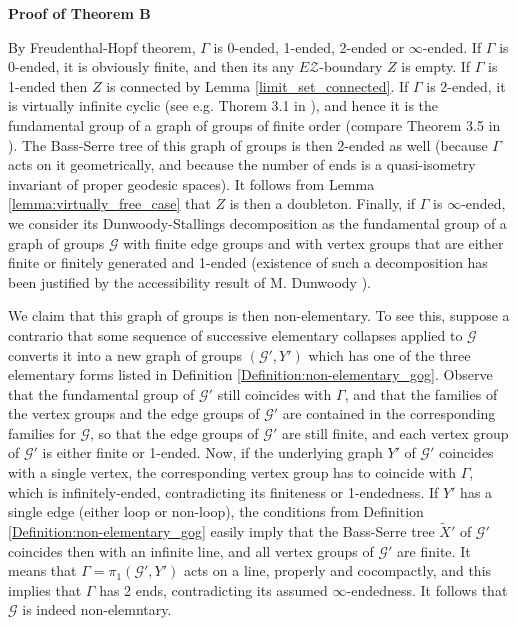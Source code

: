\documentclass[12pt, a4paper]{article}
\newcommand{\8}{\infty}
\theoremstyle{break}
\theoremstyle{defbreak}
\newcommand{\wtl}[1]{\widetilde{#1}}
\begin{document}
\noindent
{\bf Proof of Theorem B}

By Freudenthal-Hopf theorem, $\Gamma$ is 0-ended, 1-ended, 2-ended or
$\infty$-ended. If $\Gamma$ is 0-ended, it is obviously finite, and then its 
any $E\mathcal{Z}$-boundary $Z$ is empty.
If $\Gamma$ is 1-ended then $Z$ is connected by
Lemma \ref{limit_set_connected}. If $\Gamma$ is 2-ended, it is virtually infinite cyclic
(see e.g. Thorem 3.1 in \cite{Wall}), and hence it is the fundamental group
of a graph of groups of finite order (compare Theorem 3.5 in \cite{Wall}). 
The Bass-Serre tree of this 
graph of groups
is then 2-ended as well  (because $\Gamma$
acts on it geometrically, and because the number of ends is a quasi-isometry invariant of proper geodesic spaces). It follows from Lemma \ref{lemma:virtually_free_case} 
that $Z$ is then a doubleton.
Finally, if $\Gamma$ is $\infty$-ended, we consider its Dunwoody-Stallings
decomposition as the fundamental group of a graph of groups
$\mathcal{G}$
with finite edge groups and with vertex groups that are either finite
or finitely generated and 1-ended (existence of such a decomposition has been justified by the accessibility result of M. Dunwoody \cite{Dunwoody}). 

We claim that this graph of groups is then non-elementary.
To see this, suppose a contrario that some sequence of successive elementary collapses applied to $\mathcal{G}$ converts it into
a new graph of groups $(\mathcal{G}',Y')$ which has one of the three
elementary forms listed in Definition \ref{Definition:non-elementary_gog}.
Observe that the fundamental group of $\mathcal{G}'$ still coincides with $\Gamma$, and that the families of the vertex groups and the edge groups of $\mathcal{G}'$ are contained in the corresponding
families for $\mathcal{G}$, so that the edge groups of $\mathcal{G}'$
are still finite, and each vertex group of $\mathcal{G}'$ is either finite or 1-ended. Now, if the underlying graph $Y'$ of $\mathcal{G}'$ coincides with a single vertex, the corresponding vertex group has to coincide with $\Gamma$, which is infinitely-ended, contradicting its finiteness or 1-endedness. If $Y'$ has a single edge (either loop or non-loop), the conditions from Definition \ref{Definition:non-elementary_gog} easily imply that the Bass-Serre tree $\wtl{X}'$ of $\mathcal{G}'$ coincides then with an infinite line, and all vertex groups of $\mathcal{G}'$ are finite. It means that $\Gamma=\pi_1(\mathcal{G}',Y')$ acts on a line, properly and cocompactly, and this implies that $\Gamma$ has 2 ends,
contradicting its assumed $\infty$-endedness. It follows that $\mathcal{G}$ is indeed non-elemntary.
\end{document}
